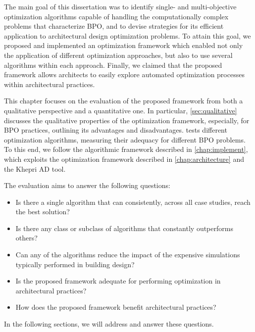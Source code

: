 \label{chap:evaluation}

The main goal of this dissertation was to identify single- and multi-objective optimization algorithms capable of handling the computationally complex problems that characterize \ac{BPO}, and to devise strategies for its efficient application to architectural design optimization problems. To attain this goal, we proposed and implemented an optimization framework which enabled not only the application of different optimization approaches, but also to use several algorithms within each approach.  Finally, we claimed that the proposed framework allows architects to easily explore automated optimization processes within architectural practices. 

This chapter focuses on the evaluation of the proposed framework from both a qualitative perspective and a quantitative one. In particular, \cref{sec:qualitative} discusses the qualitative properties of the optimization framework, especially, for \ac{BPO} practices, outlining its advantages and disadvantages.  tests different optimization algorithms, measuring their adequacy for different \ac{BPO} problems. To this end, we follow the algorithmic framework described in \cref{chap:implement}, which exploits the optimization framework described in \cref{chap:architecture} and the Khepri \ac{AD} tool. 

The evaluation aims to answer the following questions: 
\begin{itemize}
	\item Is there a single algorithm that can consistently, across all case studies, reach the best solution?
	\item Is there any class or subclass of algorithms that constantly outperforms others?
	\item Can any of the algorithms reduce the impact of the expensive simulations typically performed in building design? 
	\item Is the proposed framework adequate for performing optimization in architectural practices? 
	\item How does the proposed framework benefit architectural practices?
\end{itemize}
In the following sections, we will address and answer these questions.

